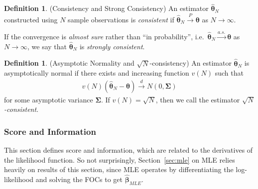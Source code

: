 \documentclass[12pt]{article}
\theoremstyle{plain}
\theoremstyle{definition}
\newtheorem{defn}[thm]{Definition}
\theoremstyle{remark}
\newcommand{\ra}{\rightarrow}
\newcommand{\bstheta}{\boldsymbol{\theta}}
\newcommand{\bsTheta}{\boldsymbol{\Theta}}
\newcommand{\bsSigma}{\boldsymbol{\Sigma}}
\newcommand{\bshatbeta}{\boldsymbol{\hat{\beta}}}
\newcommand{\bshattheta}{\boldsymbol{\hat{\theta}}}
\newcommand{\bstildetheta}{\boldsymbol{\tilde{\theta}}}
\newcommand{\asto}{\xrightarrow{a.s.}}
\newcommand{\pto}{\xrightarrow{P}}
\newcommand{\dto}{\xrightarrow{d}}
\newcommand{\nN}{_{n=1}^N}
\begin{document}
\begin{defn}(Consistency and Strong Consistency)
An estimator $\bshattheta_N$ constructed using $N$ sample observations
is \emph{consistent} if $\bshattheta_N\pto \bstheta$ as $N\ra\infty$.

If the convergence is \emph{almost sure} rather than ``in probability'',
i.e.\ $\bshattheta_N\asto \bstheta$ as $N\ra\infty$, we say that
$\bshattheta_N$ is \emph{strongly consistent}.
\end{defn}


\begin{defn}(Asymptotic Normality and $\sqrt{N}$-consistency)
An estimator $\bshattheta_N$ is asymptotically normal if there exists
and increasing function $v(N)$ such that
\begin{align*}
  v(N)(\bshattheta_N -\bstheta) \dto N(0,\bsSigma)
\end{align*}
for some asymptotic variance $\bsSigma$. If $v(N)=\sqrt{N}$, then we
call the estimator \emph{$\sqrt{N}$-consistent}.
\end{defn}



\clearpage
\subsubsection{Score and Information}
\label{sec:scoreinfo}



This section defines score and information, which are related to the
derivatives of the likelihood function.
So not surprisingly, Section~\ref{sec:mle} on MLE relies heavily on
results of this section, since MLE operates by differentiating the
log-likelihood and solving the FOCs to get $\bshatbeta_{MLE}$.
\end{document}
